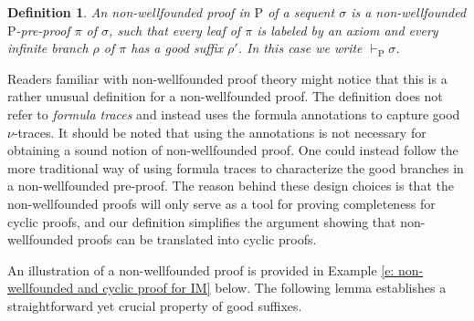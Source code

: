 \documentclass{myifcolog}
\newcommand{\hickp}{\mathrm{P}}
\newtheorem{definition}[theorem]{Definition}
\numberwithin{theorem}{section}
\begin{document}
\begin{definition}
    An \emph{non-wellfounded proof} in $\hickp$ of a sequent $\sigma$ is a non-wellfounded $\hickp$-pre-proof $\pi$ of $\sigma$, such that every leaf of $\pi$ is labeled by an axiom and every infinite branch $\rho$ of $\pi$ has a good suffix $\rho'$. In this case we write $\vdash_\hickp \sigma$.
\end{definition}

Readers familiar with non-wellfounded proof theory might notice that this is a rather unusual definition for a non-wellfounded proof. The definition does not refer to \emph{formula traces} and instead uses the formula annotations to capture good $\nu$-traces. It should be noted that using the annotations is not necessary for obtaining a sound notion of non-wellfounded proof. One could instead follow the more traditional way of using formula traces to characterize the good branches in a non-wellfounded pre-proof. The reason behind these design choices is that the non-wellfounded proofs will only serve as a tool for proving completeness for cyclic proofs, and our definition simplifies the argument showing that non-wellfounded proofs can be translated into cyclic proofs.

An illustration of a non-wellfounded proof is provided in Example \ref{e: non-wellfounded and cyclic proof for IM} below. The following lemma establishes a straightforward yet crucial property of good suffixes.
\end{document}
